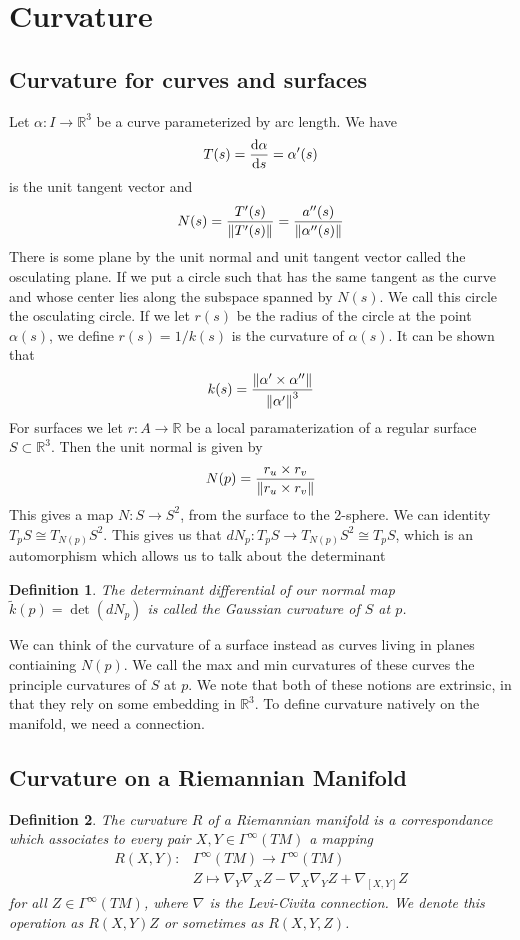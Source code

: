 \documentclass[a4paper]{article}
\newtheorem*{defn}{Definition}
\begin{document}
\section*{Curvature}%

\subsection*{Curvature for curves and surfaces}%
Let $\alpha: I \rightarrow \mathds{R}^3$ be a curve parameterized by arc length. We have
\[
  T(s) =  \dv{\alpha}{s} = \alpha'(s)
\]
is the unit tangent vector and
\[
  N(s) = \frac{T'(s)}{\norm{T'(s)}} = \frac{a''(s)}{\norm{\alpha''(s)}}
\]
There is some plane by the unit normal and unit tangent vector called the osculating plane. If we put a circle such that has the same tangent as the curve and whose center lies along the subspace spanned by $N(s)$. We call this circle the osculating circle. If we let $r(s)$ be the radius of the circle at the point $\alpha(s)$, we define $r(s) = 1/k(s)$ is the curvature of $\alpha(s)$. It can be shown that 
\[
  k(s) = \frac{\norm{\alpha' \times \alpha''}}{\norm{\alpha'}^3}
\]
For surfaces we let $r: A \rightarrow \mathds{R}$ be a local paramaterization of a regular surface $S \subset \mathds{R}^3$. Then the unit normal is given by 
\[
N(p) = \frac{r_u \times r_v}{\norm{r_u \times r_v}}
\]
This gives a map $N: S \rightarrow S^2$, from the surface to the 2-sphere. We can identity $T_pS \cong T_{N(p)}S^2$. This gives us that $dN_p: T_pS \rightarrow T_{N(p)}S^2 \cong T_pS$, which is an automorphism which allows us to talk about the determinant
\begin{defn}
  The determinant differential of our normal map $\tilde{k}(p) = \det (dN_p)$ is called the Gaussian curvature of $S$ at $p$.
\end{defn}
We can think of the curvature of a surface instead as curves living in planes contiaining $N(p)$. We call the max and min curvatures of these curves the principle curvatures of $S$ at $p$. We note that both of these notions are extrinsic, in that they rely on some embedding in $\mathds{R}^3$. To define curvature natively on the manifold, we need a connection.

\subsection*{Curvature on a Riemannian Manifold}%

\begin{defn}
  The curvature $R$ of a Riemannian manifold is a correspondance which associates to every pair $X,Y \in \Gamma^{\infty}(TM)$ a mapping 
  \[
    \begin{aligned}
      R(X,Y): &\Gamma^{\infty}(TM) \rightarrow \Gamma^{\infty}(TM) \\
              & Z \mapsto \nabla_Y\nabla_X Z - \nabla_X \nabla_Y Z + \nabla_{[X,Y]} Z
    \end{aligned}
  \]
  for all $Z \in \Gamma^{\infty}(TM)$, where $\nabla$ is the Levi-Civita connection. We denote this operation as $R(X,Y)Z$ or sometimes as $R(X,Y,Z)$.
\end{defn}
\end{document}
